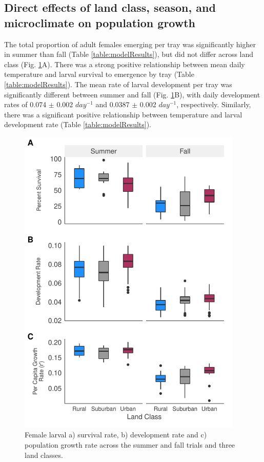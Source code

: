 \documentclass[12pt]{article}
\begin{document}
\subsection{Direct effects of land class, season, and microclimate on population growth}

The total proportion of adult females emerging per tray was significantly higher in summer than fall (Table \ref{table:modelResults}), but did not differ across land class (Fig. \ref{fig:growth}A). There was a strong positive relationship between mean daily temperature and larval survival to emergence by tray (Table \ref{table:modelResults}). The mean rate of larval development per tray was significantly different between summer and fall (Fig. \ref{fig:growth}B), with daily development rates of 0.074 $\pm$ 0.002 $day^{-1}$ and 0.0387 $\pm$ 0.002 $day^{-1}$, respectively. Similarly, there was a significant positive relationship between temperature and larval development rate (Table \ref{table:modelResults}).

\begin{figure}
\centering\includegraphics[height=15cm, keepaspectratio]{Figure3.pdf}
\caption{Female larval a) survival rate, b) development rate and c) population growth rate across the summer and fall trials and three land classes.}
\label{fig:growth}
\end{figure}
\end{document}
